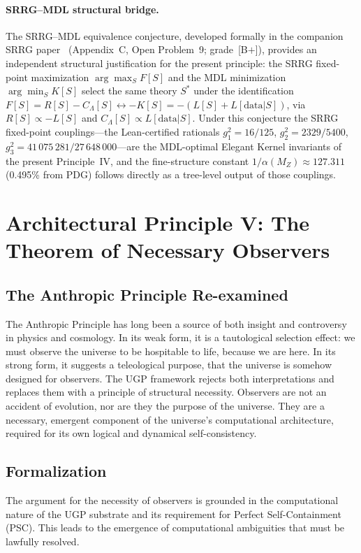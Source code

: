 \documentclass[12pt]{article}
\begin{document}
\paragraph{SRRG--MDL structural bridge.}
The SRRG--MDL equivalence conjecture, developed formally in the companion SRRG
paper~\cite{SpivackSRRG} (Appendix~C, Open Problem~9; grade~[B$+$]), provides an
independent structural justification for the present principle: the SRRG fixed-point
maximization $\arg\max_S F[S]$ and the MDL minimization $\arg\min_S K[S]$ select the
same theory $S^*$ under the identification $F[S] = R[S]-C_\Lambda[S]
\leftrightarrow -K[S] = -(L[S]+L[\text{data}|S])$, via $R[S]\propto-L[S]$ and
$C_\Lambda[S]\propto L[\text{data}|S]$.  Under this conjecture the SRRG
fixed-point couplings---the Lean-certified rationals $g_1^2=16/125$,
$g_2^2=2329/5400$, $g_3^2=41\,075\,281/27\,648\,000$---are the MDL-optimal
Elegant Kernel invariants of the present Principle~IV, and the
fine-structure constant $1/\alpha(M_Z)\approx 127.311$ (0.495\% from PDG) follows
directly as a tree-level output of those couplings.

\section{Architectural Principle V: The Theorem of Necessary Observers}
\label{sec:necessary_observers}

\subsection{The Anthropic Principle Re-examined}
The Anthropic Principle has long been a source of both insight and controversy in physics and cosmology. In its weak form, it is a tautological selection effect: we must observe the universe to be hospitable to life, because we are here. In its strong form, it suggests a teleological purpose, that the universe is somehow designed for observers. The UGP framework rejects both interpretations and replaces them with a principle of structural necessity. Observers are not an accident of evolution, nor are they the purpose of the universe. They are a necessary, emergent component of the universe's computational architecture, required for its own logical and dynamical self-consistency.

\subsection{Formalization}
The argument for the necessity of observers is grounded in the computational nature of the UGP substrate and its requirement for Perfect Self-Containment (PSC). This leads to the emergence of computational ambiguities that must be lawfully resolved.
\end{document}
